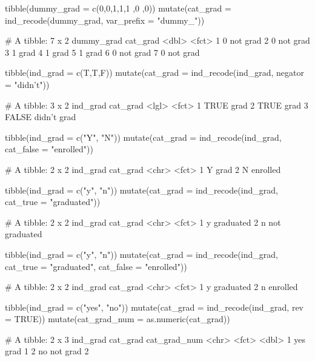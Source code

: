 \begin{Schunk}
\begin{Sinput}
tibble(dummy_grad = c(0,0,1,1,1 ,0 ,0)) %
  mutate(cat_grad  = ind_recode(dummy_grad, var_prefix = "dummy_"))
\end{Sinput}
\begin{Soutput}
     # A tibble: 7 x 2
       dummy_grad cat_grad
            <dbl> <fct>   
     1          0 not grad
     2          0 not grad
     3          1 grad    
     4          1 grad    
     5          1 grad    
     6          0 not grad
     7          0 not grad
\end{Soutput}
\begin{Sinput}
tibble(ind_grad = c(T,T,F)) %
  mutate(cat_grad  = ind_recode(ind_grad, negator = "didn't"))
\end{Sinput}
\begin{Soutput}
     # A tibble: 3 x 2
       ind_grad cat_grad   
       <lgl>    <fct>      
     1 TRUE     grad       
     2 TRUE     grad       
     3 FALSE    didn't grad
\end{Soutput}
\begin{Sinput}
tibble(ind_grad = c("Y", "N")) %
  mutate(cat_grad  = ind_recode(ind_grad, cat_false = "enrolled"))
\end{Sinput}
\begin{Soutput}
     # A tibble: 2 x 2
       ind_grad cat_grad
       <chr>    <fct>   
     1 Y        grad    
     2 N        enrolled
\end{Soutput}
\begin{Sinput}
tibble(ind_grad = c("y", "n")) %
  mutate(cat_grad  = ind_recode(ind_grad, 
                                cat_true = "graduated"))
\end{Sinput}
\begin{Soutput}
     # A tibble: 2 x 2
       ind_grad cat_grad     
       <chr>    <fct>        
     1 y        graduated    
     2 n        not graduated
\end{Soutput}
\begin{Sinput}
tibble(ind_grad = c("y", "n")) %
  mutate(cat_grad  = ind_recode(ind_grad, 
                                cat_true = "graduated", 
                                cat_false = "enrolled"))
\end{Sinput}
\begin{Soutput}
     # A tibble: 2 x 2
       ind_grad cat_grad 
       <chr>    <fct>    
     1 y        graduated
     2 n        enrolled
\end{Soutput}
\begin{Sinput}
tibble(ind_grad = c("yes", "no")) %
  mutate(cat_grad  = ind_recode(ind_grad, rev = TRUE)) %
  mutate(cat_grad_num = as.numeric(cat_grad))
\end{Sinput}
\begin{Soutput}
     # A tibble: 2 x 3
       ind_grad cat_grad cat_grad_num
       <chr>    <fct>           <dbl>
     1 yes      grad                1
     2 no       not grad            2
\end{Soutput}
\end{Schunk}

